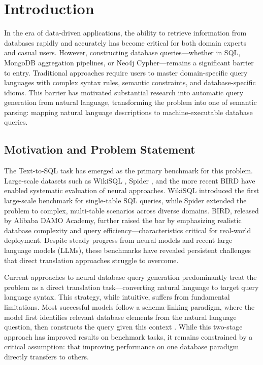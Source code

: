 \documentclass[conference]{IEEEtran}
\begin{document}
\section{Introduction}

In the era of data-driven applications, the ability to retrieve information from databases rapidly and accurately has become critical for both domain experts and casual users. However, constructing database queries—whether in SQL, MongoDB aggregation pipelines, or Neo4j Cypher—remains a significant barrier to entry. Traditional approaches require users to master domain-specific query languages with complex syntax rules, semantic constraints, and database-specific idioms. This barrier has motivated substantial research into automatic query generation from natural language, transforming the problem into one of semantic parsing: mapping natural language descriptions to machine-executable database queries.

\subsection{Motivation and Problem Statement}

The Text-to-SQL task has emerged as the primary benchmark for this problem. Large-scale datasets such as WikiSQL \cite{b1}, Spider \cite{b2}, and the more recent BIRD \cite{b3} have enabled systematic evaluation of neural approaches. WikiSQL introduced the first large-scale benchmark for single-table SQL queries, while Spider extended the problem to complex, multi-table scenarios across diverse domains. BIRD, released by Alibaba DAMO Academy, further raised the bar by emphasizing realistic database complexity and query efficiency—characteristics critical for real-world deployment. Despite steady progress from neural models and recent large language models (LLMs), these benchmarks have revealed persistent challenges that direct translation approaches struggle to overcome.

Current approaches to neural database query generation predominantly treat the problem as a direct translation task—converting natural language to target query language syntax. This strategy, while intuitive, suffers from fundamental limitations. Most successful models follow a schema-linking paradigm, where the model first identifies relevant database elements from the natural language question, then constructs the query given this context \cite{b4, b5}. While this two-stage approach has improved results on benchmark tasks, it remains constrained by a critical assumption: that improving performance on one database paradigm directly transfers to others.
\end{document}
